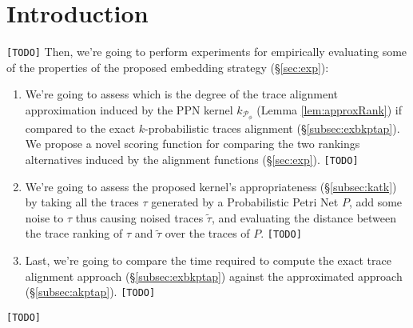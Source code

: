 \section{Introduction}\label{introduction}
\texttt{\color{red}[TODO]}
Then, we're going to perform experiments for empirically evaluating some of the properties of the proposed embedding strategy (\S\ref{sec:exp}):
\begin{enumerate}
	\item We're going to assess which is the degree of the trace alignment approximation induced by the PPN kernel $k_{\mathcal{P}_\phi}$ (Lemma \ref{lem:approxRank}) if compared to the exact $k$-probabilistic traces alignment (\S\ref{subsec:exbkptap}). We propose a novel scoring function for comparing the two rankings alternatives induced by the alignment functions (\S\ref{sec:exp}). \texttt{\color{red}[TODO]}
	\item We're going to assess the proposed kernel's appropriateness (\S\ref{subsec:katk}) by taking all the traces $\tau$ generated by a Probabilistic Petri Net $P$, add some noise to $\tau$ thus causing noised traces $\tilde{\tau}$, and evaluating the distance between the trace ranking of $\tau$ and $\tilde{\tau}$ over the traces of $P$. \texttt{\color{red}[TODO]}
	\item Last, we're going to compare the time required to compute the exact trace alignment approach (\S\ref{subsec:exbkptap}) against the approximated approach (\S\ref{subsec:akptap}). \texttt{\color{red}[TODO]}
\end{enumerate}
\texttt{\color{red}[TODO]}

